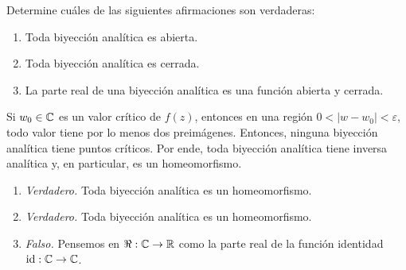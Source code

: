 \begin{exercise}
Determine cuáles de las siguientes afirmaciones son verdaderas:
\begin{enumerate}[label=(\alph*)]
    \item Toda biyección analítica es abierta.
    \item Toda biyección analítica es cerrada.
    \item La parte real de una biyección analítica es una función abierta y cerrada.
\end{enumerate}
\end{exercise}

\begin{solution}
Si $w_0 \in \mathbb C$ es un valor crítico de $f(z)$, entonces en una región $0 < |w - w_0| < \varepsilon$, todo valor tiene por lo menos dos preimágenes. Entonces, ninguna biyección analítica tiene puntos críticos. Por ende, toda biyección analítica tiene inversa analítica y, en particular, es un homeomorfismo.

\begin{enumerate}[label=(\alph*)]
    \item \textit{Verdadero.} Toda biyección analítica es un homeomorfismo.
    \item \textit{Verdadero.} Toda biyección analítica es un homeomorfismo.
    \item \textit{Falso.} Pensemos en $\Re : \mathbb C \to \mathbb R$ como la parte real de la función identidad $\operatorname{id} : \mathbb C \to \mathbb C$.
\end{enumerate}
\end{solution}
